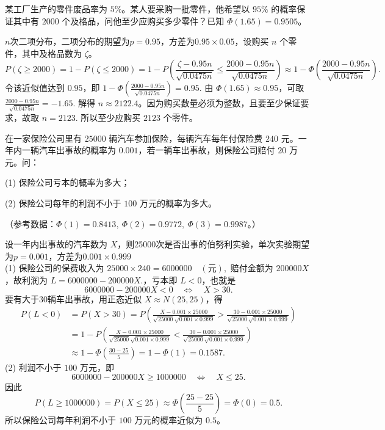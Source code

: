 \documentclass[lang=cn,11pt]{elegantbook}
\begin{document}
\begin{exercise}\label{exer:src-2005-2a-16}
某工厂生产的零件废品率为 \(5\%\)。某人要采购一批零件，他希望以 \(95\%\) 的概率保证其中有 \(2000\) 个及格品，问他至少应购买多少零件？已知 \(\Phi(1.65)=0.9505\)。
\end{exercise}
\begin{solution}
$n$次二项分布，二项分布的期望为$p=0.95$，方差为$0.95\times0.05$，设购买 \(n\) 个零件，其中及格品数为 \(\zeta\)。
\[
P(\zeta\ge 2000)=1-P(\zeta\le 2000)=1-P\left(\frac{\zeta-0.95n}{\sqrt{0.0475n}}\le\frac{2000-0.95n}{\sqrt{0.0475n}}\right)
\approx
1-\Phi\!\left(\frac{2000-0.95n}{\sqrt{0.0475n}}\right).
\]
令该近似值达到 \(0.95\)，即
\(
1-\Phi\!\left(\frac{2000-0.95n}{\sqrt{0.0475n}}\right)=0.95.
\)
由 \(\Phi(1.65)\approx0.95\)，可取
\(
\frac{2000-0.95n}{\sqrt{0.0475n}}=-1.65.
\)
解得 \(n\approx 2122.4\)。因为购买数量必须为整数，且要至少保证要求，故取
\(
n=2123.
\)
所以至少应购买 \(2123\) 个零件。
\end{solution}

\begin{exercise}\label{exer:src-2006-2a-12}
在一家保险公司里有 \(25000\) 辆汽车参加保险，每辆汽车每年付保险费 \(240\) 元。一年内一辆汽车出事故的概率为 \(0.001\)，若一辆车出事故，则保险公司赔付 \(20\) 万元。问：\par
(1) 保险公司亏本的概率为多大；\par
(2) 保险公司每年的利润不小于 \(100\) 万元的概率为多大。\par
（参考数据：\(\Phi(1)=0.8413,\ \Phi(2)=0.9772,\ \Phi(3)=0.9987\)。）
\end{exercise}
\begin{solution}
设一年内出事故的汽车数为 \(X\)，则25000次是否出事的伯努利实验，单次实验期望为$p=0.001$，方差为$0.001\times0.999$\\
(1) 保险公司的保费收入为
\(
25000\times240=6000000\quad(\text{元}),
\)
赔付金额为 \(200000X\)，故利润为
\(
L=6000000-200000X.
\)，亏本即 \(L<0\)，也就是
\[
6000000-200000X<0 \quad\Longleftrightarrow\quad X>30.
\]要有大于30辆车出事故，用正态近似 \(X\approx N(25,25)\)，得
\begin{align*}
P(L<0)&=P(X>30)=P\left(\frac{X-0.001\times25000}{\sqrt{25000}\sqrt{0.001\times0.999}}>\frac{30-0.001\times25000}{\sqrt{25000}\sqrt{0.001\times0.999}}\right)\\
&=1-P\left(\frac{X-0.001\times25000}{\sqrt{25000}\sqrt{0.001\times0.999}}<\frac{30-0.001\times25000}{\sqrt{25000}\sqrt{0.001\times0.999}}\right)\\
&\approx 1-\Phi\left(\frac{30-25}{5}\right)
=1-\Phi(1)
=0.1587.
\end{align*}
(2) 利润不小于 \(100\) 万元，即
\[
6000000-200000X\ge1000000
\quad\Longleftrightarrow\quad
X\le25.
\]
因此
\[
P(L\ge1000000)=P(X\le25)
\approx \Phi\left(\frac{25-25}{5}\right)
=\Phi(0)=0.5.
\]
所以保险公司每年利润不小于 \(100\) 万元的概率近似为 \(0.5\)。
\end{solution}
\end{document}
